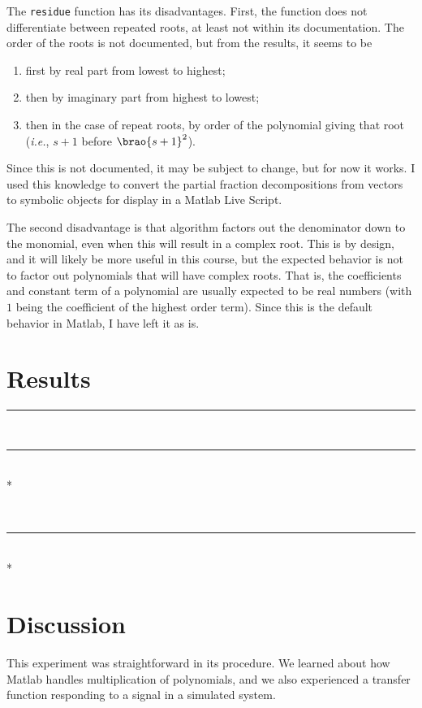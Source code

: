 \documentclass[12pt]{article}
\DeclarePairedDelimiter\brao()%
\newlength\oldparskip
\newlength\newparskip
\newcommand*\setparskip{\setlength\parskip\newparskip}
\newcommand*\resetparskip{\setlength\parskip\oldparskip}
\def\hr{{\par\noindent\rule{\textwidth}{0.4pt}}}
\begin{document}
The \texttt{residue} function has its disadvantages.
First, the function does not differentiate between repeated roots, at least not within its documentation.
The order of the roots is not documented, but from the results, it seems to be
\begin{enumerate}
    \item first by real part from lowest to highest;
    \item then by imaginary part from highest to lowest;
    \item then in the case of repeat roots, by order of the polynomial giving that root (\textit{i.e.}, $s+1$ before $\brao{s+1}^2$).
\end{enumerate}

Since this is not documented, it may be subject to change, but for now it works.
I used this knowledge to convert the partial fraction decompositions from vectors to symbolic objects for display in a Matlab Live Script.

The second disadvantage is that algorithm factors out the denominator down to the monomial, even when this will result in a complex root.
This is by design, and it will likely be more useful in this course,
but the expected behavior is not to factor out polynomials that will have complex roots.
That is, the coefficients and constant term of a polynomial are usually expected to be real numbers (with $1$ being the coefficient of the highest order term).
Since this is the default behavior in Matlab, I have left it as is.

\section{Results}

\hr
\resetparskip

\setparskip

\ \hr \\*
\resetparskip

\setparskip

\ \hr \\*

\section{Discussion}

This experiment was straightforward in its procedure.
We learned about how Matlab handles multiplication of polynomials,
and we also experienced a transfer function responding to a signal in a simulated system.
\end{document}
